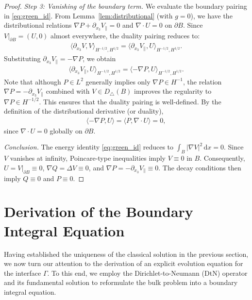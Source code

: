 \documentclass{article}
\theoremstyle{remark}
\theoremstyle{definition}
\numberwithin{equation}{section}
\begin{document}
\begin{proof}
    \textit{Step 3: Vanishing of the boundary term.}
    We evaluate the boundary pairing in \eqref{eq:green_id}.
    From Lemma~\ref{lem:distributional} (with $g=0$), we have the distributional relations $\nabla P + \partial_{x_3}V_\parallel = 0$ and $\nabla \cdot U = 0$ on $\partial B$.
    Since $V|_{\partial B} = (U, 0)$ almost everywhere, the duality pairing reduces to:
    \begin{align*}
        \langle \partial_{x_3}V, V \rangle_{H^{-1/2}, H^{1/2}} 
        = \langle \partial_{x_3}V_\parallel, U \rangle_{H^{-1/2}, H^{1/2}}.
    \end{align*}
    Substituting $\partial_{x_3}V_\parallel = -\nabla P$, we obtain
    \begin{align*}
        \langle \partial_{x_3}V_\parallel, U \rangle_{H^{-1/2}, H^{1/2}} = \langle -\nabla P, U \rangle_{H^{-1/2}, H^{1/2}}.
    \end{align*}
    Note that although $P \in L^2$ generally implies only $\nabla P \in H^{-1}$, the relation $\nabla P = -\partial_{x_3}V_\parallel$ combined with $V \in D_\triangle(B)$ improves the regularity to $\nabla P \in H^{-1/2}$. This ensures that the duality pairing is well-defined.
    By the definition of the distributional derivative (or duality),
    \begin{align*}
        \langle -\nabla P, U \rangle = \langle P, \nabla \cdot U \rangle = 0,
    \end{align*}
    since $\nabla \cdot U = 0$ globally on $\partial B$.

    \textit{Conclusion.}
    The energy identity \eqref{eq:green_id} reduces to $\int_B|\nabla V|^2\,\mathrm{d}x = 0$.
    Since $V$ vanishes at infinity, Poincare-type inequalities imply $V \equiv 0$ in $B$.
    Consequently, $U = V|_{\partial B} \equiv 0$, $\nabla Q = \Delta V \equiv 0$, and $\nabla P = -\partial_{x_3}V_\parallel \equiv 0$. The decay conditions then imply $Q \equiv 0$ and $P \equiv 0$.
\end{proof}




\section{Derivation of the Boundary Integral Equation}
\label{sec:ILLSS-to-BIE}

Having established the uniqueness of the classical solution in the previous section, we now turn our attention to the derivation of an explicit evolution equation for the interface $\Gamma$. To this end, we employ the Dirichlet-to-Neumann (DtN) operator and its fundamental solution to reformulate the bulk problem into a boundary integral equation.
\end{document}
